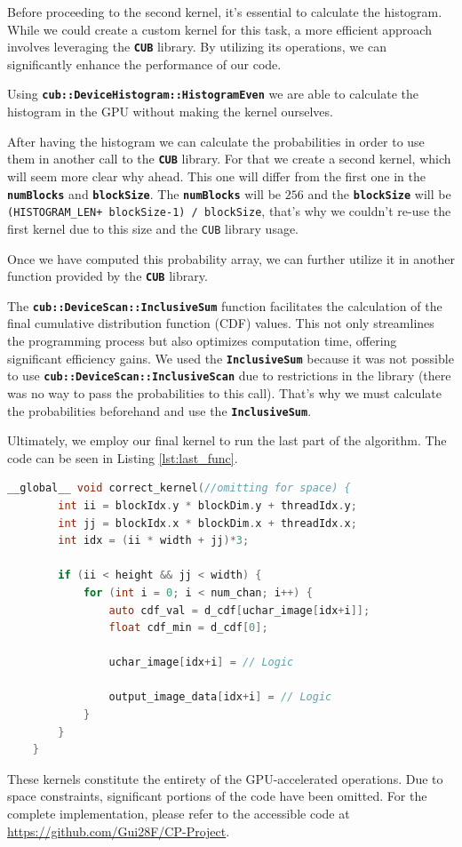 \documentclass[sigconf]{acmart}
\begin{document}
Before proceeding to the second kernel, it's essential to calculate the histogram. While we could create a custom kernel for this task, a more efficient approach involves leveraging the \texttt{\textbf{CUB}} library. By utilizing its operations, we can significantly enhance the performance of our code.

Using \texttt{\textbf{cub::DeviceHistogram::HistogramEven}} we are able to calculate the histogram in the GPU without making the kernel ourselves.

After having the histogram we can calculate the probabilities in order to use them in another call to the \texttt{\textbf{CUB}} library. For that we create a second kernel, which will seem more clear why ahead. This one will differ from the first one in the \texttt{\textbf{numBlocks}} and \texttt{\textbf{blockSize}}. The \texttt{\textbf{numBlocks}} will be $256$ and the \texttt{\textbf{blockSize}} will be \texttt{(HISTOGRAM\_LEN+ blockSize-1) / blockSize}, that's why we couldn't re-use the first kernel due to this size and the \texttt{CUB} library usage.

Once we have computed this probability array, we can further utilize it in another function provided by the \texttt{\textbf{CUB}}  library.

The \texttt{\textbf{cub::DeviceScan::InclusiveSum}} function facilitates the calculation of the final cumulative distribution function (CDF) values. This not only streamlines the programming process but also optimizes computation time, offering significant efficiency gains. We used the \texttt{\textbf{InclusiveSum}} because it was not possible to use \texttt{\textbf{cub::DeviceScan::InclusiveScan}} due to restrictions in the library (there was no way to pass the probabilities to this call). That's why we must calculate the probabilities beforehand and use the \texttt{\textbf{InclusiveSum}}.

Ultimately, we employ our final kernel to run the last part of the algorithm. The code can be seen in Listing \ref{lst:last_func}.

\begin{lstlisting}[language=C, caption=Correct and Rescale, label={lst:last_func}]
 __global__ void correct_kernel(//omitting for space) {
        int ii = blockIdx.y * blockDim.y + threadIdx.y;
        int jj = blockIdx.x * blockDim.x + threadIdx.x;
        int idx = (ii * width + jj)*3;

        if (ii < height && jj < width) {
            for (int i = 0; i < num_chan; i++) {
                auto cdf_val = d_cdf[uchar_image[idx+i]];
                float cdf_min = d_cdf[0];
                
                uchar_image[idx+i] = // Logic

                output_image_data[idx+i] = // Logic
            }
        }
    }
\end{lstlisting}
These kernels constitute the entirety of the GPU-accelerated operations. Due to space constraints, significant portions of the code have been omitted. For the complete implementation, please refer to the accessible code at \url{https://github.com/Gui28F/CP-Project}. 
\end{document}
